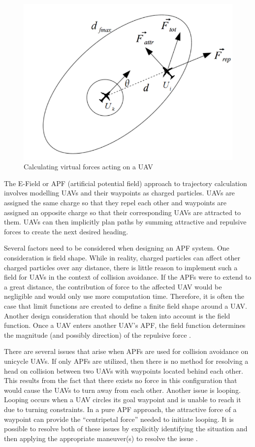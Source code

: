 \documentclass[conference]{IEEEtran}
\begin{document}
\begin{figure}
	\includegraphics [width=1\columnwidth] {2011Ruchti}
	\caption{Calculating virtual forces acting on a UAV \cite{ruchti2011uav}}
	\label{fig:forceCalculation}
\end{figure}


The E-Field or APF (artificial potential field) approach to trajectory calculation involves modelling UAVs and their waypoints as charged particles.  UAVs are assigned the same charge so that they repel each other and waypoints are assigned an opposite charge so that their corresponding UAVs are attracted to them.  UAVs can then implicitly plan paths by summing attractive and repulsive forces to create the next desired heading.

Several factors need to be considered when designing an APF system.  One consideration is field shape.  While in reality, charged particles can affect other charged particles over any distance, there is little reason to implement such a field for UAVs in the context of collision avoidance.  If the APFs were to extend to a great distance, the contribution of force to the affected UAV would be negligible and would only use more computation time.  Therefore, it is often the case that limit functions are created to define a finite field shape around a UAV.  Another design consideration that should be taken into account is the field function.  Once a UAV enters another UAV's APF, the field function determines the magnitude (and possibly direction) of the repulsive force \cite{khatib1985real}.

There are several issues that arise when APFs are used for collision avoidance on unicycle UAVs.  If only APFs are utilized, then there is no method for resolving a head on collision between two UAVs with waypoints located behind each other.  This results from the fact that there exists no force in this configuration that would cause the UAVs to turn away from each other.  Another issue is looping.  Looping occurs when a UAV circles its goal waypoint and is unable to reach it due to turning constraints.  In a pure APF approach, the attractive force of a waypoint can provide the “centripetal force” needed to initiate looping.  It is possible to resolve both of these issues by explicitly identifying the situation and then applying the appropriate maneuver(s) to resolve the issue \cite{ruchti2011uav}.
\end{document}
